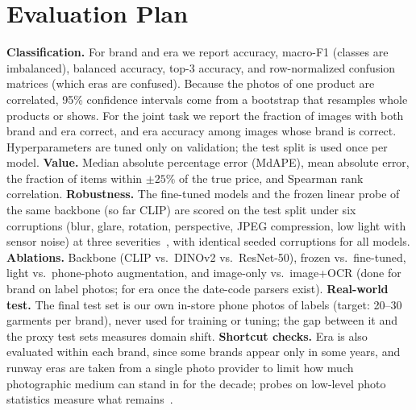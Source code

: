 \section{Evaluation Plan}
\label{sec:evalplan}
\textbf{Classification.} For brand and era we report accuracy, macro-F1 (classes are
imbalanced), balanced accuracy, top-3 accuracy, and row-normalized confusion matrices
(which eras are confused). Because the photos of one product are correlated, 95\% confidence
intervals come from a bootstrap that resamples whole products or shows. For the joint task we
report the fraction of images with both brand and era correct, and era accuracy among images
whose brand is correct. Hyperparameters are tuned only on validation; the test split is used
once per model.
\textbf{Value.} Median absolute percentage error (MdAPE), mean absolute error, the fraction of
items within $\pm25\%$ of the true price, and Spearman rank correlation.
\textbf{Robustness.} The fine-tuned models and the frozen linear probe of the same backbone (so far
CLIP) are scored on the test split under six corruptions (blur,
glare, rotation, perspective, JPEG compression, low light with sensor noise) at three
severities~\cite{hendrycks2019corruptions}, with identical seeded corruptions for all models.
\textbf{Ablations.} Backbone (CLIP vs.\ DINOv2 vs.\ ResNet-50), frozen vs.\ fine-tuned,
light vs.\ phone-photo augmentation, and image-only vs.\ image+OCR (done for brand on label photos;
for era once the date-code parsers exist).
\textbf{Real-world test.} The final test set is our own in-store phone photos of labels
(target: 20--30 garments per brand), never used for training or tuning; the gap between it and
the proxy test sets measures domain shift.
\textbf{Shortcut checks.} Era is also evaluated within each brand, since some brands appear
only in some years, and runway eras are taken from a single photo provider to limit how much photographic medium can
stand in for the decade; probes on low-level photo statistics measure what remains~\cite{geirhos2020shortcut}.
